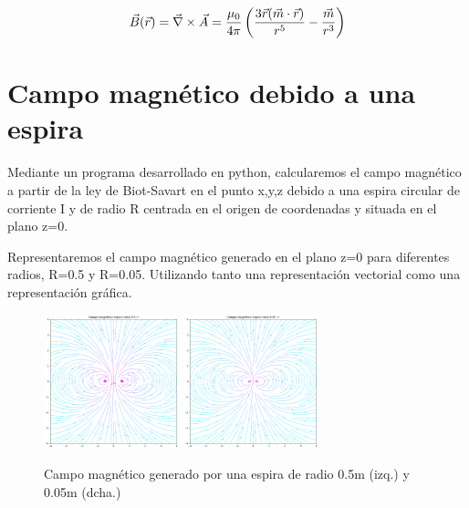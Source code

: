 \documentclass[11pt]{article}
\begin{document}
        \vspace{-0.15cm}
        \begin{equation}
            \centering
                \vec{B}(\vec{r})=\vec{\nabla} \times \vec{A}=\frac{\mu_{0}}{4\pi}\left ( \frac{3\vec{r}(\vec{m}\cdot \vec{r})}{r^{5}}-\frac{\vec{m}}{r^{3}} \right )
            \label{eq:campdipolo}
        \end{equation}

\clearpage
\section{Campo magnético debido a una espira}

\vspace{5mm} Mediante un programa desarrollado en python, calcularemos el campo magnético a partir de la ley de Biot-Savart en el punto x,y,z debido a una espira circular de corriente I y de radio R centrada en el origen de coordenadas y situada en el plano z=0. 

\vspace{5mm} Representaremos el campo magnético generado en el plano z=0 para diferentes radios, R=0.5 y R=0.05. Utilizando tanto una representación vectorial como una representación gráfica.

        \begin{figure}[h]
            \centering
            \includegraphics[width=0.35\textwidth]{Mag espira.png}
            \hspace{1cm}
            \includegraphics[width=0.35\textwidth]{mag 0.05 espira.png}
            \caption{Campo magnético generado por una espira de radio 0.5m (izq.) y 0.05m (dcha.)}
        \end{figure}
\end{document}
